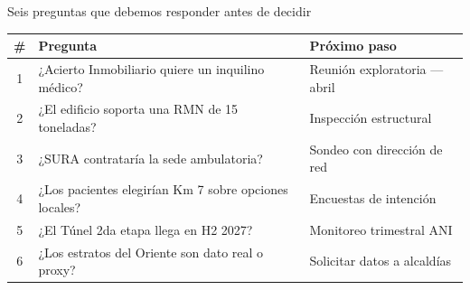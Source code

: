 \documentclass[aspectratio=169, 12pt]{beamer}
\begin{document}
\begin{frame}{Seis preguntas que debemos responder antes de decidir}

\vspace{-2pt}
{\scriptsize
\begin{tabular}{@{}cp{7cm}p{4cm}@{}}
\toprule
\textbf{\#} & \textbf{Pregunta} & \textbf{Próximo paso} \\
\midrule
\rowcolor{resultado!6}
1 & ¿Acierto Inmobiliario quiere un inquilino médico? & Reunión exploratoria --- abril \\
2 & ¿El edificio soporta una RMN de 15 toneladas? & Inspección estructural \\
\rowcolor{resultado!6}
3 & ¿SURA contrataría la sede ambulatoria? & Sondeo con dirección de red \\
4 & ¿Los pacientes elegirían Km 7 sobre opciones locales? & Encuestas de intención \\
\rowcolor{resultado!6}
5 & ¿El Túnel 2da etapa llega en H2 2027? & Monitoreo trimestral ANI \\
6 & ¿Los estratos del Oriente son dato real o proxy? & Solicitar datos a alcaldías \\
\bottomrule
\end{tabular}
}

\vspace{4pt}
\begin{center}
\end{center}
\end{frame}
\end{document}

